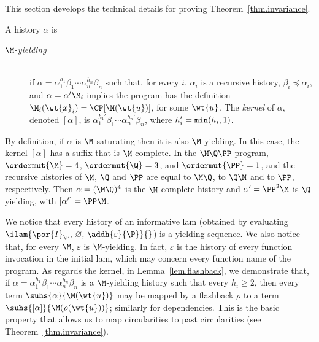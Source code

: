 

This section develops the technical details for proving Theorem~\ref{thm.invariance}.

\begin{definition}
A history $\alpha$ is 
\begin{description}
\item[$\M$-\emph{yielding}] 
\ \\
if
$\alpha = \alpha_1^{h_1}\beta_1 \cdots 
\alpha_n^{h_n} \beta_n$ such that, for every $i$, 
$\alpha_i$ is a recursive history, $\beta_i \preceq \alpha_i$, 
and $\alpha = \alpha' \M_i$ implies the program has the definition
$\M_i(\wt{x}_i) = \CP[\M(\wt{u}) ]$, for some $\wt{u}$.
The \emph{kernel} of $\alpha$, denoted $[\alpha]$, is 
$\alpha_1^{h_1'}\beta_1 \cdots \alpha_{n}^{h_n'}\beta_{n}$,
where $h_i' = {\tt min}(h_i, 1)$.
\end{description}
\end{definition}


By definition, if $\alpha$ is $\M$-saturating then it is also 
$\M$-yielding. In this case, the kernel $[\alpha]$ has a suffix that
 is $\M$-complete. 
In the $\M\Q\PP$-program,  $\ordermut{\M}=4$,
$\ordermut{\Q}=3$, and $\ordermut{\PP}=1$, and
the recursive histories of $\M$, $\Q$ and $\PP$ are equal to $\M\Q$, to 
$\Q\M$ and to $\PP$, respectively.
Then $\alpha= (\M\Q)^{4}$ is the $\M$-complete history and 
$\alpha'= \PP^2\M$ is $\Q$-yielding, with $[\alpha']=\PP\M$.

We notice that every history of an informative
lam (obtained by evaluating $\ilam{\por{I}_{\P},\,\varnothing ,\, 
\addh{\varepsilon}{\P}}{}$) is a yielding sequence.
We also notice that, for every $\M$, $\varepsilon$ is $\M$-yielding.
In fact, $\varepsilon$ is the history of every function invocation in the
initial lam, which may concern every function name of the program.
As regards the kernel, 
in Lemma~\ref{lem.flashback}, we 
demonstrate that, 
if $\alpha = \alpha_1^{h_1}\beta_1 \cdots \alpha_n^{h_n} \beta_n$ is a $\M$-yielding history such that every $h_i \geq 2$,
then every term 
$\suhs{\alpha}{\M(\wt{u})}$ may be mapped by a flashback $\rho$ to a term
$\suhs{[\alpha]}{\M(\rho(\wt{u}))}$; similarly for dependencies. This is the
basic property that allows us to map circularities to past circularities
 (see Theorem~\ref{thm.invariance}). 

